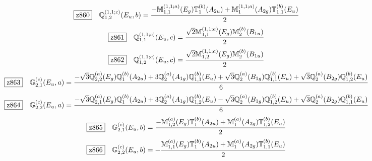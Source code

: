 \documentclass[fleqn,10pt,landscape]{jsarticle}
\begin{document}
\begin{dmath*}
\hspace*{3mm}\fbox{z860}\quad \mathbb{Q}_{1,2}^{(1,1;c)}(E_{u},b)=\frac{- \mathbb{M}_{1,1}^{(1,1;a)}(E_{g}) \mathbb{T}_{1}^{(b)}(A_{2u}) + \mathbb{M}_{1}^{(1,1;a)}(A_{2g}) \mathbb{T}_{1,1}^{(b)}(E_{u})}{2}
\end{dmath*}
\begin{dmath*}
\hspace*{3mm}\fbox{z861}\quad \mathbb{Q}_{1,1}^{(1,1;c)}(E_{u},c)=\frac{\sqrt{2} \mathbb{M}_{1,1}^{(1,1;a)}(E_{g}) \mathbb{M}_{2}^{(b)}(B_{1u})}{2}
\end{dmath*}
\begin{dmath*}
\hspace*{3mm}\fbox{z862}\quad \mathbb{Q}_{1,2}^{(1,1;c)}(E_{u},c)=\frac{\sqrt{2} \mathbb{M}_{1,2}^{(1,1;a)}(E_{g}) \mathbb{M}_{2}^{(b)}(B_{1u})}{2}
\end{dmath*}
\begin{dmath*}
\hspace*{3mm}\fbox{z863}\quad \mathbb{G}_{2,1}^{(c)}(E_{u},a)=\frac{- \sqrt{3} \mathbb{Q}_{2,2}^{(a)}(E_{g}) \mathbb{Q}_{1}^{(b)}(A_{2u}) + 3 \mathbb{Q}_{2}^{(a)}(A_{1g}) \mathbb{Q}_{1,1}^{(b)}(E_{u}) + \sqrt{3} \mathbb{Q}_{2}^{(a)}(B_{1g}) \mathbb{Q}_{1,1}^{(b)}(E_{u}) + \sqrt{3} \mathbb{Q}_{2}^{(a)}(B_{2g}) \mathbb{Q}_{1,2}^{(b)}(E_{u})}{6}
\end{dmath*}
\begin{dmath*}
\hspace*{3mm}\fbox{z864}\quad \mathbb{G}_{2,2}^{(c)}(E_{u},a)=\frac{- \sqrt{3} \mathbb{Q}_{2,1}^{(a)}(E_{g}) \mathbb{Q}_{1}^{(b)}(A_{2u}) + 3 \mathbb{Q}_{2}^{(a)}(A_{1g}) \mathbb{Q}_{1,2}^{(b)}(E_{u}) - \sqrt{3} \mathbb{Q}_{2}^{(a)}(B_{1g}) \mathbb{Q}_{1,2}^{(b)}(E_{u}) + \sqrt{3} \mathbb{Q}_{2}^{(a)}(B_{2g}) \mathbb{Q}_{1,1}^{(b)}(E_{u})}{6}
\end{dmath*}
\begin{dmath*}
\hspace*{3mm}\fbox{z865}\quad \mathbb{G}_{2,1}^{(c)}(E_{u},b)=\frac{- \mathbb{M}_{1,2}^{(a)}(E_{g}) \mathbb{T}_{1}^{(b)}(A_{2u}) + \mathbb{M}_{1}^{(a)}(A_{2g}) \mathbb{T}_{1,2}^{(b)}(E_{u})}{2}
\end{dmath*}
\begin{dmath*}
\hspace*{3mm}\fbox{z866}\quad \mathbb{G}_{2,2}^{(c)}(E_{u},b)=- \frac{\mathbb{M}_{1,1}^{(a)}(E_{g}) \mathbb{T}_{1}^{(b)}(A_{2u}) + \mathbb{M}_{1}^{(a)}(A_{2g}) \mathbb{T}_{1,1}^{(b)}(E_{u})}{2}
\end{dmath*}
\end{document}
